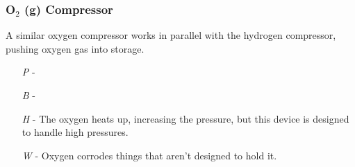 \documentclass[a4paper]{article}
\begin{document}
\vspace{-0.5cm} \hspace{-18pt} \subsubsection{O$_2$ (g) Compressor} \label{life_o2_compressor} \vspace{-0.2cm}
A similar oxygen compressor works in parallel with the hydrogen compressor, pushing oxygen gas into storage.
\begin{enumerate}
\item [\textit{P}] -  \\
\item [\textit{B}] -  \\
\item [\textit{H}] - The oxygen heats up, increasing the pressure, but this device is designed to handle high pressures.
\item [\textit{W}] - Oxygen corrodes things that aren't designed to hold it.
\end{enumerate}
\end{document}

